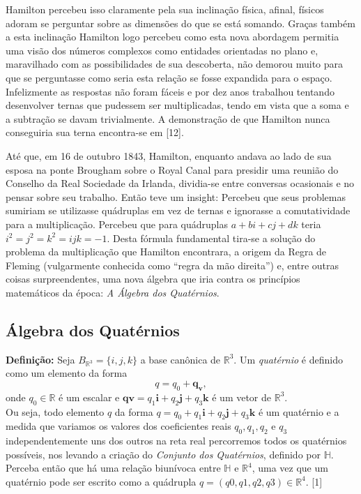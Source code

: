 \documentclass[a4paper,12pt]{article}
\begin{document}
	Hamilton percebeu isso claramente pela sua inclinação física, afinal, físicos adoram se perguntar sobre as dimensões do que se está somando. Graças também a esta inclinação Hamilton logo percebeu como esta nova abordagem permitia uma visão dos números complexos como entidades orientadas no plano e, maravilhado com as possibilidades de sua descoberta, não demorou muito para que se perguntasse como seria esta relação se fosse expandida para o espaço. Infelizmente as respostas não foram fáceis e por dez anos trabalhou tentando desenvolver ternas que pudessem ser multiplicadas, tendo em vista que a soma e a subtração se davam trivialmente. A demonstração de que Hamilton nunca conseguiria sua terna encontra-se em [12]. 
	
	Até que, em 16 de outubro 1843, Hamilton, enquanto andava ao lado de sua esposa na ponte Brougham sobre o Royal Canal para presidir uma reunião do Conselho da Real Sociedade da Irlanda, dividia-se entre conversas ocasionais e no pensar sobre seu trabalho. Então teve um insight: Percebeu que seus problemas sumiriam se utilizasse quádruplas em vez de ternas e ignorasse a comutatividade para a multiplicação. Percebeu que para quádruplas $a + bi + cj + dk$ teria $i^2 = j^2 = k^2 = ijk = -1$. Desta fórmula fundamental tira-se a solução do problema da multiplicação que Hamilton encontrara, a origem da Regra de Fleming (vulgarmente conhecida como “regra da mão direita”) e, entre outras coisas surpreendentes, uma nova álgebra que iria contra os princípios matemáticos da época: \textit{A Álgebra dos Quatérnios}.
	
	\subsection{Álgebra dos Quatérnios}
	\textbf{Definição: }Seja $B_{\mathbb{R}^3}=\{i,j,k\}$ a base canônica de $\mathbb{R}^3$. Um \textit{quatérnio} é definido como um elemento da forma 
	\begin{equation}
	q=q_0+\mathbf{q_v},
	\end{equation} 
	onde $q_0 \in \mathbb{R}$ é um escalar e $\mathbf{qv}=q_1\mathbf{i}+q_2\mathbf{j}+q_3\mathbf{k}$ é um vetor de $\mathbb{R}^3$.
	\\
	
	Ou seja, todo elemento $q$ da forma $q = q_0 + q_1\textbf{i} + q_2\textbf{j} + q_3\textbf{k}$ é um quatérnio e a medida que variamos os valores dos coeficientes reais $q_0, q_1, q_2$ e $q_3$ independentemente uns dos outros na reta real percorremos todos os quatérnios possíveis, nos levando a criação do \textit{Conjunto dos Quatérnios}, definido por $\mathbb{H}$. Perceba então que há uma relação biunívoca entre $\mathbb{H}$ e $\mathbb{R}^4$, uma vez que um quatérnio pode ser escrito como a quádrupla $q = (q0, q1, q2, q3) \in \mathbb{R}^4$. [1]
	\\
	
\end{document}
